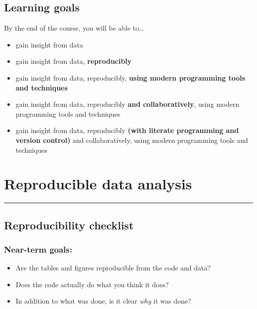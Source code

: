\documentclass[
]{book}
\providecommand{\tightlist}{%
  \setlength{\itemsep}{0pt}\setlength{\parskip}{0pt}}
\theoremstyle{definition}
\theoremstyle{definition}
\theoremstyle{definition}
\theoremstyle{definition}
\theoremstyle{remark}
\begin{document}
\hypertarget{learning-goals-1}{%
\section{Learning goals}\label{learning-goals-1}}

By the end of the course, you will be able to\ldots{}

\begin{itemize}
\tightlist
\item
  gain insight from data
\item
  gain insight from data, \textbf{reproducibly}
\item
  gain insight from data, reproducibly, \textbf{using modern programming tools and techniques}
\item
  gain insight from data, reproducibly \textbf{and collaboratively}, using modern programming tools and techniques
\item
  gain insight from data, reproducibly \textbf{(with literate programming and version control)} and collaboratively, using modern programming tools and techniques
\end{itemize}

\hypertarget{reproducible-data-analysis}{%
\chapter{Reproducible data analysis}\label{reproducible-data-analysis}}

\begin{center}\rule{0.5\linewidth}{0.5pt}\end{center}

\hypertarget{reproducibility-checklist}{%
\section{Reproducibility checklist}\label{reproducibility-checklist}}

\hypertarget{near-term-goals}{%
\subsection{Near-term goals:}\label{near-term-goals}}

\begin{itemize}
\tightlist
\item
  Are the tables and figures reproducible from the code and data?
\item
  Does the code actually do what you think it does?
\item
  In addition to what was done, is it clear \emph{why} it was done?
\end{itemize}
\end{document}
